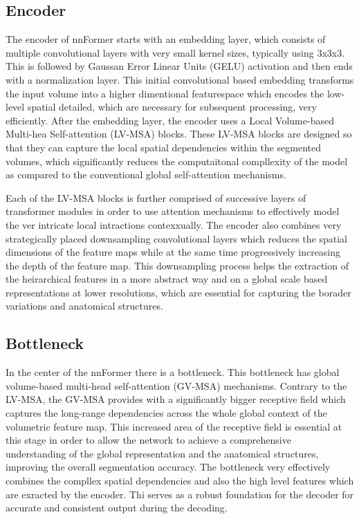 \subsection{Encoder}
The encoder of nnFormer starts with an embedding layer, which consists of multiple convolutional layers with very small kernel sizes, typically using 3x3x3. This is followed by Gaussan Error Linear Units (GELU) activation and then ends with a normalization layer. This initial convolutional based embedding transforms the input volume into a higher dimentional featurespace which encodes the low-level spatial detailed, which are necessary for subsequent processing, very efficiently. After the embedding layer, the encoder uses a Local Volume-based Multi-hea Self-attention (LV-MSA) blocks. These LV-MSA blocks are designed so that they can capture the local spatial dependencies within the segmented volumes, which significantly reduces the computaitonal compllexity of the model as compared to the conventional global self-attention mechanisms. 

Each of the LV-MSA blocks is further comprised of successive layers of transformer modules in order to use attention mechanisms to effectively model the ver intricate local intractions contexxually. The encoder also combines very strategically placed downsampling convolutional layers which reduces the spatial dimensions of the feature maps while at the same time progressively increasing the depth of the feature map. This downsampling process helps the extraction of the heirarchical features in a more abstract way and on a global scale based representations at lower resolutions, which are essential for capturing the borader variations and anatomical structures.

\subsection{Bottleneck}
In the center of the nnFormer there is a bottleneck. This bottleneck has global volume-based multi-head self-attention (GV-MSA) mechanisms. Contrary to the LV-MSA, the GV-MSA provides with a significantly bigger receptive field which captures the long-range dependencies across the whole global context of the volumetric feature map. This increased area of the receptive field is essential at this stage in order to allow the network to achieve a comprehensive understanding of the global representation and the anatomical structures, improving the overall segmentation accuracy. The bottleneck very effectively combines the compllex spatial dependencies and also the high level features which are exracted by the encoder. Thi serves as a robust foundation for the decoder for accurate and consistent output during the decoding.

